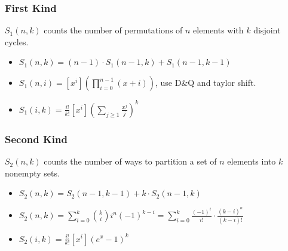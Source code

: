 \subsubsection{First Kind}

$S_1(n, k)$ counts the number of permutations of $n$ elements with $k$ disjoint cycles.

\begin{itemize}
  \item
    $S_1(n, k) = (n - 1) \cdot S_1(n - 1, k) + S_1(n - 1, k - 1)$
  \item
    $S_1(n, i) = [x^i] \left(\prod _ {i=0} ^ {n-1} (x + i)\right)$,
    use D\&Q and taylor shift.
  \item
    \(
    S_1(i, k) = \frac{i!}{k!} \left[x^i\right] 
    \left(\sum _ {j \ge 1} \frac{x^j}{j}\right)^k
    \)
\end{itemize}

\subsubsection{Second Kind}

$S_2(n, k)$ counts the number of ways to partition a set of $n$ elements into $k$ nonempty sets.

\begin{itemize}
  \item $S_2(n, k) = S_2(n - 1, k - 1) + k \cdot S_2(n - 1, k)$
  \item
    \(
    S_2(n, k) = \sum_{i = 0}^k \binom{k}{i}i^n (-1)^{k - i} = \sum_{i = 0}^k \frac{(-1)^i}{i!} \cdot \frac{(k - i)^n}{(k - i)!}
    \)
  \item
    \(
    S_2(i, k) = \frac{i!}{k!} [x^i] \left(e^x - 1\right)^k
    \)
\end{itemize}
